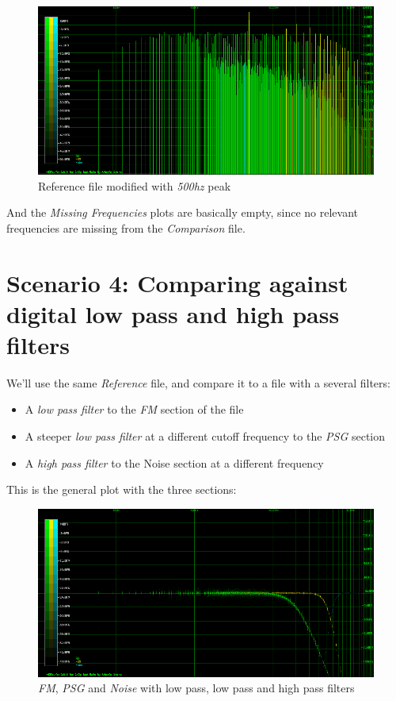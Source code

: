 \documentclass[10pt,a4paper]{report}
\begin{document}
\begin{figure}[H]
	\centering
	\includegraphics[width=1.0\linewidth]{images/interpretation/Plot3-Spectrogram-500hz.png}
	\caption[Reference File]{Reference file modified with \textit{500hz} peak}
	\label{fig:plot3-spectrogram-1kHz}
\end{figure}


And the \textit{Missing Frequencies} plots are basically empty, since no relevant frequencies are missing from the \textit{Comparison} file.

\section{Scenario 4: Comparing against digital low pass and high pass filters}

We'll use the same \textit{Reference} file, and compare it to a file with a several filters:

\begin{itemize}
	\item A \textit{low pass filter} to the \textit{FM} section of the file
	\item A steeper \textit{low pass filter} at a different cutoff frequency to the \textit{PSG} section
	\item A \textit{high pass filter} to the Noise section at a different frequency
\end{itemize}

This is the general plot with the three sections:

\begin{figure}[H]
	\centering
	\includegraphics[width=1.0\linewidth]{images/interpretation/Plot4-1-All.png}
	\caption[All Plotted]{\textit{FM}, \textit{PSG} and \textit{Noise} with low pass, low pass and high pass filters}
	\label{fig:plot4-1-all}
\end{figure}
\end{document}
